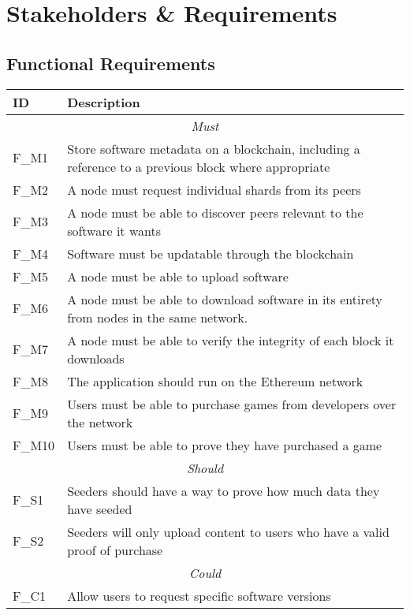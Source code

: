 
\section{Stakeholders \& Requirements}



\subsection{Functional Requirements}

\begin{longtable}{ p{} p{} }
  \toprule
  \textbf{ID} & \textbf{Description}
  \\\midrule\midrule
  \multicolumn{2}{c}{\cellcolor{red!70}\textit{Must}}\\\midrule
  F\_M1 & Store software metadata on a blockchain, including a reference to a previous block where appropriate\\
  F\_M2 & A node must request individual shards from its peers\\
  F\_M3 & A node must be able to discover peers relevant to the software it wants\\
  F\_M4 & Software must be updatable through the blockchain\\
  F\_M5 & A node must be able to upload software\\
  F\_M6 & A node must be able to download software in its entirety from nodes in the same network.\\
  F\_M7 & A node must be able to verify the integrity of each block it downloads\\
  F\_M8 & The application should run on the Ethereum network\\
  F\_M9 & Users must be able to purchase games from developers over the network\\
  F\_M10 & Users must be able to prove they have purchased a game\\
  \midrule\multicolumn{2}{c}{\cellcolor{orange!70}\textit{Should}}\\\midrule
  F\_S1 & Seeders should have a way to prove how much data they have seeded\\
  F\_S2 & Seeders will only upload content to users who have a valid proof of purchase\\
  \midrule\multicolumn{2}{c}{\cellcolor{green}\textit{Could}}\\\midrule
  F\_C1 & Allow users to request specific software versions\\
  \midrule
  \bottomrule
\end{longtable}

